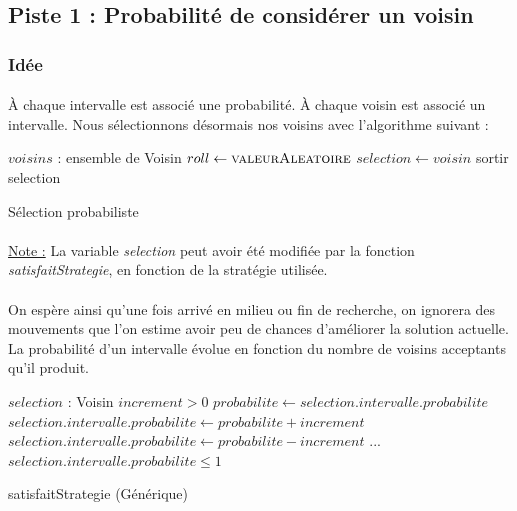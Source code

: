 \documentclass[a4paper,10pt]{report}
\begin{document}
\subsection{Piste 1 : Probabilité de considérer un voisin}
\subsubsection{Idée}

\paragraph{}
À chaque intervalle est associé une probabilité. À chaque voisin est associé un
intervalle. Nous sélectionnons désormais nos voisins avec l'algorithme suivant :

\begin{algorithm}[h]
  \begin{algorithmic}
    \Require $voisins$ : ensemble de Voisin
      \State $roll\gets \Call{valeurAleatoire}{}$
	\State $selection \gets voisin$
	\State sortir
      \EndIf
    \EndFor
      \Return selection
    \EndIf
  \end{algorithmic}
  \caption{Sélection probabiliste}
\end{algorithm}

\paragraph{}
\underline{Note :} La variable \textit{selection} peut avoir été modifiée par la
fonction \textit{satisfaitStrategie}, en fonction de la stratégie utilisée.

\paragraph{}
  On espère ainsi qu'une fois arrivé en milieu ou fin de recherche, on ignorera
des mouvements que l'on estime avoir peu de chances d'améliorer la solution
actuelle. La probabilité d'un intervalle évolue en fonction du nombre de voisins
acceptants qu'il produit.


\begin{algorithm}[h]
  \begin{algorithmic}
    \Require $selection$ : Voisin
    \Require $increment > 0$
    \State 
    \State $probabilite \gets selection.intervalle.probabilite$
      \State $selection.intervalle.probabilite \gets probabilite + increment$
    \Else
      \State $selection.intervalle.probabilite \gets probabilite - increment$
    \EndIf
    \State ...
    \Ensure $selection.intervalle.probabilite \leq 1$
  \end{algorithmic}
  \caption{satisfaitStrategie (Générique)}
\end{algorithm}
\end{document}
